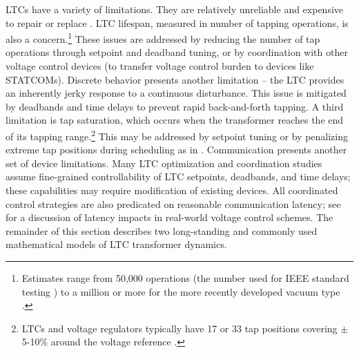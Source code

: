 \documentclass[10pt,letterpaper]{article}
\begin{document}
LTCs have a variety of limitations. They are relatively unreliable and expensive to repair or replace \cite{baghsorkhi2015,agalgaonkar2014}. LTC lifespan, measured in number of tapping operations, is also a concern.\footnote{Estimates range from 50,000 operations (the number used for IEEE standard testing \cite{ieee1995}) to a million or more for the more recently developed vacuum type \cite{dohnal2009}.} These issues are addressed by reducing the number of tap operations through setpoint and deadband tuning, or by coordination with other voltage control devices (to transfer voltage control burden to devices like STATCOMs). Discrete behavior presents another limitation -- the LTC provides an inherently jerky response to a continuous disturbance. This issue is mitigated by deadbands and time delays to prevent rapid back-and-forth tapping. A third limitation is tap saturation, which occurs when the transformer reaches the end of its tapping range.\footnote{LTCs and voltage regulators typically have 17 or 33 tap positions covering $\pm$5-10\% around the voltage reference \cite{choi2009,agalgaonkar2014}.} This may be addressed by setpoint tuning or by penalizing extreme tap positions during scheduling as in \cite{agalgaonkar2014}. Communication presents another set of device limitations. Many LTC optimization and coordination studies assume fine-grained controllability of LTC setpoints, deadbands, and time delays; these capabilities may require modification of existing devices. All coordinated control strategies are also predicated on reasonable communication latency; see \cite{stifter2012} for a discussion of latency impacts in real-world voltage control schemes. The remainder of this section describes two long-standing and commonly used mathematical models of LTC transformer dynamics.
\end{document}

